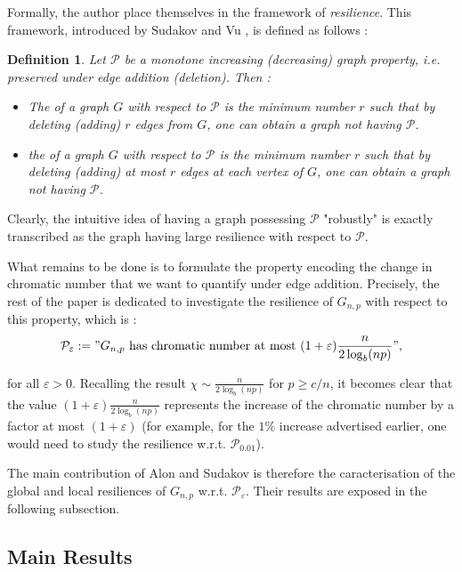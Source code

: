 \documentclass[10pt,journal,a4paper]{IEEEtran}
\newtheorem{definition}[theorem]{Definition}
\theoremstyle{definition}   %
\begin{document}
Formally, the author place themselves in the framework of \textit{resilience}. This framework, introduced by Sudakov and Vu \cite{resilience}, is defined as follows :

\begin{definition}{}{}
	Let $\mathcal{P}$ be a monotone increasing (decreasing) graph property, i.e. preserved under edge addition (deletion). Then :
	\begin{itemize}
		\item The  of a graph $G$ with respect to $\mathcal{P}$ is the minimum number $r$ such that by deleting (adding) $r$ edges from $G$, one can obtain a graph not having $\mathcal{P}$.

		\item the  of a graph $G$ with respect to $\mathcal{P}$ is the minimum number $r$ such that by deleting (adding) at most $r$ edges at each vertex of $G$, one can obtain a graph not having $\mathcal{P}$.
	\end{itemize}
	
\end{definition}

Clearly, the intuitive idea of having a graph possessing $\mathcal{P}$ "robustly" is exactly transcribed as the graph having large resilience with respect to $\mathcal{P}$. 

What remains to be done is to formulate the property encoding the change in chromatic number that we want to quantify under edge addition. Precisely, the rest of the paper is dedicated to investigate the resilience of $G_{n, p}$ with respect to this property, which is :
$$
\mathcal{P}_\varepsilon := "G_{n, p} \text{ has chromatic number at most } (1+\varepsilon) \frac{n}{2 \log_b (np)}",
$$ 

for all $\varepsilon > 0$. Recalling the result $\chi \sim \frac{n}{2 \log_b (np)}$ for $p \ge c / n$, it becomes clear that the value $(1+\varepsilon) \frac{n}{2 \log_b (np)}$ represents the increase of the chromatic number by a factor at most $(1+\varepsilon)$ (for example, for the $1\%$ increase advertised earlier, one would need to study the resilience w.r.t. $\mathcal{P}_{0.01}$).

The main contribution of Alon and Sudakov is therefore the caracterisation of the global and local resiliences of $G_{n, p}$ w.r.t. $\mathcal{P}_\varepsilon$. Their results are exposed in the following subsection.


\subsection{Main Results}
\end{document}
